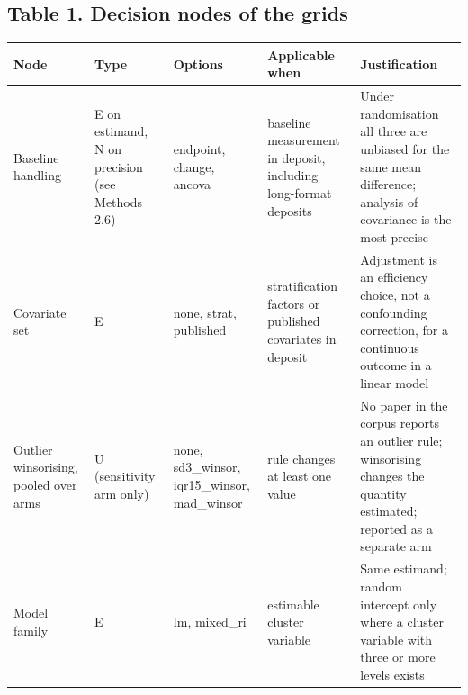 
\subsection*{Table 1. Decision nodes of the grids}\label{tab:nodes}

{
\begin{longtable}[]{@{}
  >{\raggedright\arraybackslash}p{}
  >{\raggedright\arraybackslash}p{}
  >{\raggedright\arraybackslash}p{}
  >{\raggedright\arraybackslash}p{}
  >{\raggedright\arraybackslash}p{}@{}}
\toprule\noalign{}
\begin{minipage}[b]{\linewidth}\raggedright
Node
\end{minipage} & \begin{minipage}[b]{\linewidth}\raggedright
Type
\end{minipage} & \begin{minipage}[b]{\linewidth}\raggedright
Options
\end{minipage} & \begin{minipage}[b]{\linewidth}\raggedright
Applicable when
\end{minipage} & \begin{minipage}[b]{\linewidth}\raggedright
Justification
\end{minipage} \\
\midrule\noalign{}
\endhead
\bottomrule\noalign{}
\endlastfoot
Baseline handling & E on estimand, N on precision (see Methods 2.6) & endpoint, change, ancova & baseline measurement in deposit, including long-format deposits & Under randomisation all three are unbiased for the same mean difference; analysis of covariance is the most precise \cite{Vickers_2001,Senn_2006,Van_Breukelen_2006} \\
Covariate set & E & none, strat, published & stratification factors or published covariates in deposit & Adjustment is an efficiency choice, not a confounding correction, for a continuous outcome in a linear model \cite{Kahan_2014,Kahan_2012} \\
Outlier winsorising, pooled over arms & U (sensitivity arm only) & none, sd3\_winsor, iqr15\_winsor, mad\_winsor & rule changes at least one value & No paper in the corpus reports an outlier rule; winsorising changes the quantity estimated; reported as a separate arm \\
Model family & E & lm, mixed\_ri & estimable cluster variable & Same estimand; random intercept only where a cluster variable with three or more levels exists \\

\end{longtable}}
